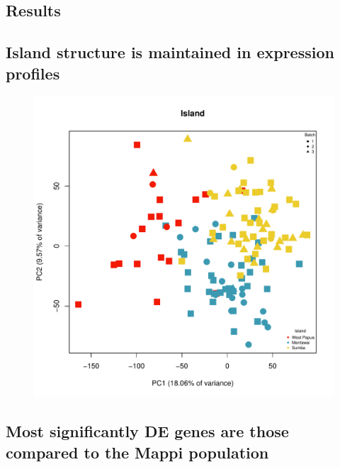 \documentclass[12pt,a4paper,titlepage,twoside,openright]{book}
\begin{document}
\begin{mainmatter}
\chapter{Results}\label{}

\section{Island structure is maintained in expression profiles}

\begin{figure}[htb!]
\centering
\includegraphics[width=\textwidth,height=\textheight,keepaspectratio]{pcaresults_Island_RemoveBatchEffect.pdf}
\caption{}
\label{fig:PCA Island}
\end{figure}

\section{Most significantly DE genes are those compared to the Mappi population}


\end{mainmatter}
\end{document}
